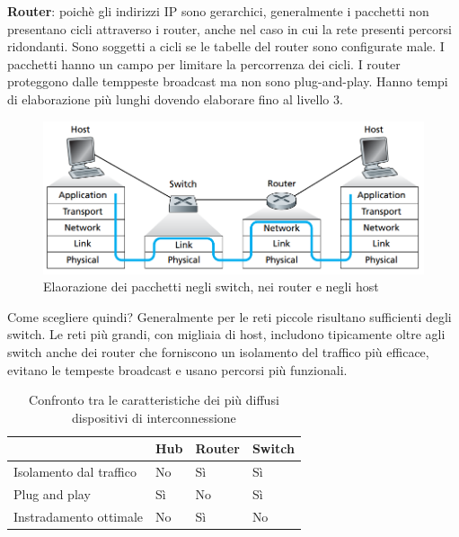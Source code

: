 \documentclass[11pt,a4paper]{book}
\begin{document}
\textbf{Router}: poichè gli indirizzi IP sono gerarchici, generalmente i pacchetti non presentano cicli attraverso i router, anche nel caso in cui la rete presenti percorsi ridondanti. Sono soggetti a cicli se le tabelle del router sono configurate male. I pacchetti hanno un campo per limitare la percorrenza dei cicli. I router proteggono dalle temppeste broadcast ma non sono plug-and-play. Hanno tempi di elaborazione più lunghi dovendo elaborare fino al livello 3.
\begin{figure}
	\includegraphics[scale=0.35]{img/087.png}
	\caption{Elaorazione dei pacchetti negli switch, nei router e negli host}
	\label{fig: 087}
\end{figure}

Come scegliere quindi? Generalmente per le reti piccole risultano sufficienti degli switch. Le reti più grandi, con migliaia di host, includono tipicamente oltre agli switch anche dei router che forniscono un isolamento del traffico più efficace, evitano le tempeste broadcast e usano percorsi più funzionali.
\begin{table}[]
	\begin{tabular}{|l|l|l|l|}
		\hline
                        & \multicolumn{1}{c|}{\textbf{Hub}} & \multicolumn{1}{c|}{\textbf{Router}} & \multicolumn{1}{c|}{\textbf{Switch}} \\ \hline
Isolamento dal traffico & No                                & Sì                                   & Sì                                   \\ \hline
Plug and play           & Sì                                & No                                   & Sì                                   \\ \hline
Instradamento ottimale  & No                                & Sì                                   & No                                   \\ \hline
	\end{tabular}
	\caption{Confronto tra le caratteristiche dei più diffusi dispositivi di interconnessione}
	\label{tab: 004}
\end{table}
\end{document}

